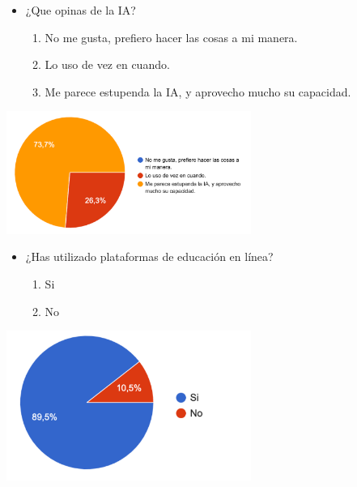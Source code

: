 \documentclass[
]{article}
\providecommand{\tightlist}{%
  \setlength{\itemsep}{0pt}\setlength{\parskip}{0pt}}
\begin{document}
\vspace{10mm}

\begin{itemize}
\tightlist
\item
  ¿Que opinas de la IA?

  \begin{enumerate}
  \def\labelenumi{\alph{enumi}.}
  \tightlist
  \item
    No me gusta, prefiero hacer las cosas a mi manera.
  \item
    Lo uso de vez en cuando.
  \item
    Me parece estupenda la IA, y aprovecho mucho su capacidad.
  \end{enumerate}
\end{itemize}

\includegraphics[width=0.6\textwidth,height=\textheight]{img/IA.png}
\newpage

\begin{itemize}
\tightlist
\item
  ¿Has utilizado plataformas de educación en línea?

  \begin{enumerate}
  \def\labelenumi{\alph{enumi}.}
  \tightlist
  \item
    Si
  \item
    No
  \end{enumerate}
\end{itemize}

\includegraphics[width=0.6\textwidth,height=\textheight]{img/utilizado.png}

\vspace{10mm}
\end{document}
